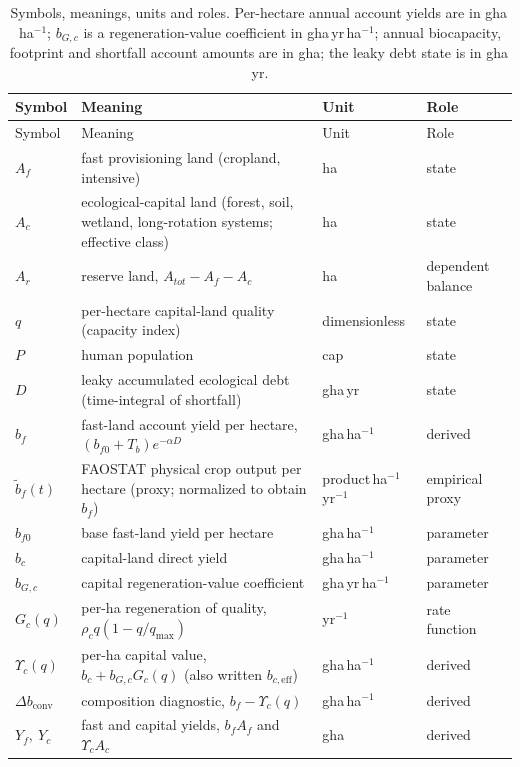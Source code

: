 \documentclass[11pt,a4paper]{article}
\newcommand{\dconv}{\Delta b_{\mathrm{conv}}}
\newcommand{\Ups}{\Upsilon_c}
\begin{document}
\begin{longtable}{>{\raggedright\arraybackslash}p{}>{\raggedright\arraybackslash}p{}>{\raggedright\arraybackslash}p{}>{\raggedright\arraybackslash}p{}}
\caption{Symbols, meanings, units and roles. Per-hectare annual account yields are in gha\,ha$^{-1}$; $b_{G,c}$ is a regeneration-value coefficient in gha\,yr\,ha$^{-1}$; annual biocapacity, footprint and shortfall account amounts are in gha; the leaky debt state is in gha\,yr.}\label{tab:si_symbols}\\
\toprule
Symbol & Meaning & Unit & Role \\
\midrule
\endfirsthead
\toprule
Symbol & Meaning & Unit & Role \\
\midrule
\endhead
$A_f$ & fast provisioning land (cropland, intensive) & ha & state \\
$A_c$ & ecological-capital land (forest, soil, wetland, long-rotation systems; effective class) & ha & state \\
$A_r$ & reserve land, $A_{tot}-A_f-A_c$ & ha & dependent balance \\
$q$ & per-hectare capital-land quality (capacity index) & dimensionless & state \\
$P$ & human population & cap & state \\
$D$ & leaky accumulated ecological debt (time-integral of shortfall) & gha\,yr & state \\
$b_f$ & fast-land account yield per hectare, $(b_{f0}+T_b)e^{-\alpha D}$ & gha\,ha$^{-1}$ & derived \\
$\tilde b_f(t)$ & FAOSTAT physical crop output per hectare (proxy; normalized to obtain $b_f$) & product\,ha$^{-1}$\,yr$^{-1}$ & empirical proxy \\
$b_{f0}$ & base fast-land yield per hectare & gha\,ha$^{-1}$ & parameter \\
$b_c$ & capital-land direct yield & gha\,ha$^{-1}$ & parameter \\
$b_{G,c}$ & capital regeneration-value coefficient & gha\,yr\,ha$^{-1}$ & parameter \\
$G_c(q)$ & per-ha regeneration of quality, $\rho_cq(1-q/q_{\max})$ & yr$^{-1}$ & rate function \\
$\Ups(q)$ & per-ha capital value, $b_c+b_{G,c}G_c(q)$ (also written $b_{c,\mathrm{eff}}$) & gha\,ha$^{-1}$ & derived \\
$\dconv$ & composition diagnostic, $b_f-\Ups(q)$ & gha\,ha$^{-1}$ & derived \\
$Y_f,\ Y_c$ & fast and capital yields, $b_fA_f$ and $\Ups A_c$ & gha & derived \\

\end{longtable}
\end{document}
